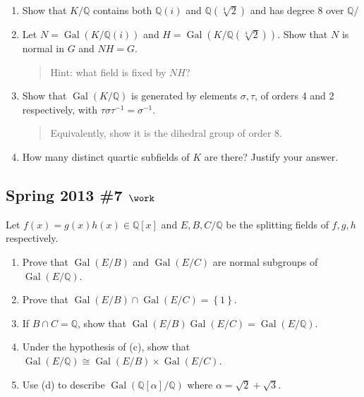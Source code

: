 \begin{enumerate}
\def\labelenumi{\alph{enumi}.}
\item
  Show that \(K/{\mathbb{Q}}\) contains both \({\mathbb{Q}}(i)\) and
  \({\mathbb{Q}}(\sqrt[4]{2})\) and has degree 8 over \({\mathbb{Q}}\)/
\item
  Let \(N = \operatorname{Gal}(K/{\mathbb{Q}}(i))\) and
  \(H = \operatorname{Gal}(K/{\mathbb{Q}}(\sqrt[4]{2}))\). Show that
  \(N\) is normal in \(G\) and \(NH = G\).

  \begin{quote}
  Hint: what field is fixed by \(NH\)?
  \end{quote}
\item
  Show that \(\operatorname{Gal}(K/{\mathbb{Q}})\) is generated by
  elements \(\sigma, \tau\), of orders 4 and 2 respectively, with
  \(\tau \sigma\tau^{-1}= \sigma^{-1}\).

  \begin{quote}
  Equivalently, show it is the dihedral group of order 8.
  \end{quote}
\item
  How many distinct quartic subfields of \(K\) are there? Justify your
  answer.
\end{enumerate}

\hypertarget{spring-2013-7-work}{%
\subsection{\texorpdfstring{Spring 2013 \#7
\(\work\)}{Spring 2013 \#7 \textbackslash work}}\label{spring-2013-7-work}}

Let \(f(x) = g(x) h(x) \in {\mathbb{Q}}[x]\) and \(E,B,C/{\mathbb{Q}}\)
be the splitting fields of \(f,g,h\) respectively.

\begin{enumerate}
\def\labelenumi{\alph{enumi}.}
\item
  Prove that \(\operatorname{Gal}(E/B)\) and \(\operatorname{Gal}(E/C)\)
  are normal subgroups of \(\operatorname{Gal}(E/{\mathbb{Q}})\).
\item
  Prove that
  \(\operatorname{Gal}(E/B) \cap\operatorname{Gal}(E/C) = \left\{{1}\right\}\).
\item
  If \(B\cap C = {\mathbb{Q}}\), show that
  \(\operatorname{Gal}(E/B) \operatorname{Gal}(E/C) = \operatorname{Gal}(E/{\mathbb{Q}})\).
\item
  Under the hypothesis of (c), show that
  \(\operatorname{Gal}(E/{\mathbb{Q}}) \cong \operatorname{Gal}(E/B) \times \operatorname{Gal}(E/C)\).
\item
  Use (d) to describe
  \(\operatorname{Gal}({\mathbb{Q}}[\alpha]/{\mathbb{Q}})\) where
  \(\alpha = \sqrt 2 + \sqrt 3\).
\end{enumerate}

